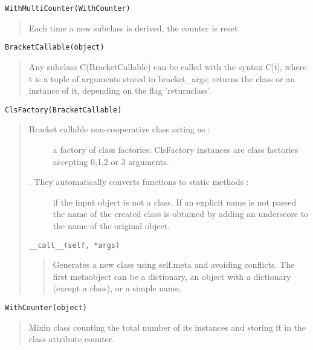 \documentclass[10pt,english]{article}
\begin{document}
\texttt{WithMultiCounter(WithCounter)}
\begin{quote}

Each time a new subclass is derived, the counter is reset
\end{quote}

\texttt{BracketCallable(object)}
\begin{quote}

Any subclass C(BracketCallable) can be called with the syntax C[t], 
where t is a tuple of arguments stored in bracket{\_}args;  returns the 
class or an instance of it, depending on the flag 'returnclass'.
\end{quote}

\texttt{ClsFactory(BracketCallable)}
\begin{quote}
\begin{description}
\item[Bracket callable non-cooperative class acting as :]

a factory of class factories.
ClsFactory instances are class factories accepting 0,1,2 or 3 arguments.

\item[. They automatically converts functions to static methods :]

if the input object is not a class. If an explicit name is not passed
the name of the created class is obtained by adding an underscore to 
the name of the original object.

\end{description}

\texttt{{\_}{\_}call{\_}{\_}(self, *args)}
\begin{quote}

Generates a new class using self.meta and avoiding conflicts.
The first metaobject can be a dictionary, an object with a
dictionary (except a class), or a simple name.
\end{quote}
\end{quote}

\texttt{WithCounter(object)}
\begin{quote}

Mixin class counting the total number of its instances and storing 
it in the class attribute counter.
\end{quote}


\end{document}

